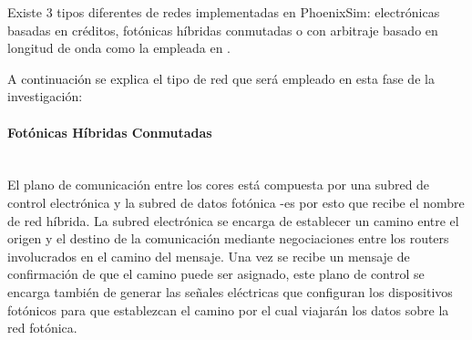 Existe 3 tipos diferentes de redes implementadas en PhoenixSim: electrónicas basadas en créditos,
fotónicas híbridas conmutadas o con arbitraje basado en longitud de onda como la empleada
en \cite{hendry2011time}.

A continuación se explica el tipo de red que será empleado en esta fase de la investigación:

\paragraph{Fotónicas Híbridas Conmutadas}~\\

El plano de comunicación entre los cores 
está compuesta por una subred de control electrónica y la subred de datos
fotónica -es por esto que recibe el nombre de red híbrida.
La subred electrónica se encarga de establecer
un camino entre el origen y el destino de la comunicación mediante
negociaciones entre los routers involucrados en el camino del mensaje.
Una vez se recibe un mensaje de confirmación de que el 
camino puede ser asignado, este plano de control se encarga también de 
generar las señales eléctricas que configuran los dispositivos fotónicos 
para que establezcan el camino por el cual viajarán los datos sobre la
red fotónica.

